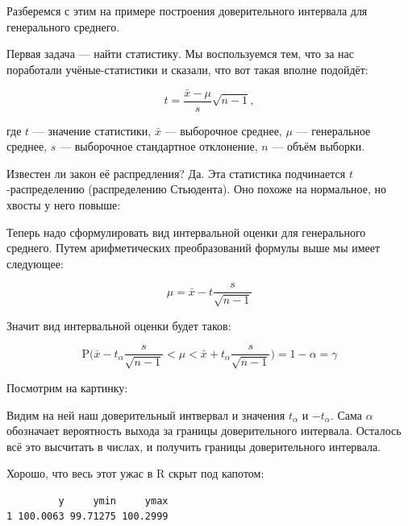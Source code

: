 \documentclass[
  letterpaper,
]{scrbook}
\newenvironment{Shaded}{}{}
\newcommand{\FunctionTok}[1]{\textcolor[rgb]{0.44,0.26,0.76}{#1}}
\newcommand{\NormalTok}[1]{\textcolor[rgb]{0.14,0.16,0.18}{#1}}
\newcommand{\SpecialCharTok}[1]{\textcolor[rgb]{0.00,0.36,0.77}{#1}}
\theoremstyle{definition}
\theoremstyle{remark}
\begin{document}
Разберемся с этим на примере построения доверительного интервала для
генерального среднего.

Первая задача --- найти статистику. Мы воспользуемся тем, что за нас
поработали учёные-статистики и сказали, что вот такая вполне подойдёт:

\[
t = \frac{\bar x - \mu}{s}\sqrt{n-1},
\]

где \(t\) --- значение статистики, \(\bar x\) --- выборочное среднее,
\(\mu\) --- генеральное среднее, \(s\) --- выборочное стандартное
отклонение, \(n\) --- объём выборки.

Известен ли закон её распредления? Да. Эта статистика подчинается
\(t\)-распределению (распределению Стьюдента). Оно похоже на нормальное,
но хвосты у него повыше:

Теперь надо сформулировать вид интервальной оценки для генерального
среднего. Путем арифметических преобразований формулы выше мы имеет
следующее:

\[
\mu = \bar x - t \frac{s}{\sqrt{n-1}}
\]

Значит вид интервальной оценки будет таков:

\[
\mathrm{P}\Big( \bar x - t_\alpha \frac{s}{\sqrt{n-1}} < \mu < 
\bar x + t_\alpha \frac{s}{\sqrt{n-1}}\Big) = 1 - \alpha = \gamma
\]

Посмотрим на картинку:

Видим на ней наш доверительный интвервал и значения \(t_\alpha\) и
\(-t_\alpha\). Сама \(\alpha\) обозначает вероятность выхода за границы
доверительного интервала. Осталось всё это высчитать в числах, и
получить границы доверительного интервала.

Хорошо, что весь этот ужас в R скрыт под капотом:

\begin{Shaded}
\end{Shaded}

\begin{verbatim}
         y     ymin     ymax
1 100.0063 99.71275 100.2999
\end{verbatim}

\begin{Shaded}
\end{Shaded}
\end{document}
